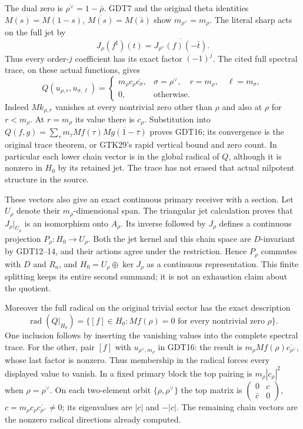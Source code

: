 The dual zero is $\rho^\vee=1-\bar\rho$.
GDT7 and the original theta identities
$M(s)=M(1-s)$,
$\overline{M(s)}=M(\bar s)$ show
$m_{\rho^\vee}=m_\rho$.
The literal sharp acts on the full jet by
\begin{equation}\tag{GDT15}
 J_\rho(f^\sharp)(t)=
 \overline{J_{\rho^\vee}(f)(-\bar t)}.
\end{equation}
Thus every order-$j$ coefficient has its exact
factor $(-1)^j$.
The cited full spectral trace, on these actual
functions, gives
\begin{equation}\tag{GDT16}
 Q(u_{\rho,r},u_{\sigma,\ell})=
 \begin{cases}
 m_\rho c_\rho\overline{c_\sigma},&
 \sigma=\rho^\vee,\quad r=m_\rho,\quad
                 \ell=m_\sigma,\\
 0,&\text{otherwise}.
 \end{cases}
\end{equation}
Indeed $Mk_{\rho,r}$ vanishes at every nontrivial
zero other than $\rho$ and also at $\rho$ for $r<m_\rho$.
At $r=m_\rho$ its value there is $c_\rho$.
Substitution into
$Q(f,g)=\sum_\tau m_\tau Mf(\tau)
\overline{Mg(1-\bar\tau)}$
proves GDT16; its convergence is the original trace
theorem, or GTK29's rapid vertical bound and zero
count. In particular each lower chain vector
is in the global radical of $Q$, although it is
nonzero in $H_0$ by its retained jet.
The trace has not erased that actual nilpotent
structure in the source.

These vectors also give an exact continuous primary
receiver with a section. Let $U_\rho$ denote their
$m_\rho$-dimensional span. The triangular jet
calculation proves that $J_\rho|_{U_\rho}$ is an
isomorphism onto $A_\rho$. Its inverse followed by
$J_\rho$ defines a continuous projection
$P_\rho:H_0\to U_\rho$.
Both the jet kernel and this chain space are
$D$-invariant by GDT12--14, and their actions agree
under the restriction. Hence $P_\rho$ commutes with
$D$ and $R_a$, and
$H_0=U_\rho\oplus\ker J_\rho$ as a continuous
representation. This finite splitting keeps its
entire second summand; it is not an exhaustion
claim about the quotient.

Moreover the full radical on the original trivial
sector has the exact description
\begin{equation}\tag{GDT16a}
 \operatorname{rad}(Q|_{H_0})=
 \{[f]\in H_0:Mf(\rho)=0
                \text{ for every nontrivial zero }\rho\}.
\end{equation}
One inclusion follows by inserting the vanishing
values into the complete spectral trace.
For the other, pair $[f]$ with
$u_{\rho^\vee,m_\rho}$ in GDT16:
the result is
$m_\rho Mf(\rho)\overline{c_{\rho^\vee}}$,
whose last factor is nonzero.
Thus membership in the radical forces every
displayed value to vanish. In a fixed primary
block the top pairing is $m_\rho|c_\rho|^2$
when $\rho=\rho^\vee$.
On each two-element orbit $\{\rho,\rho^\vee\}$
the top matrix is
$\left(\begin{smallmatrix}0&c\\\bar c&0\end{smallmatrix}\right)$,
$c=m_\rho c_\rho\overline{c_{\rho^\vee}}\ne0$;
its eigenvalues are $|c|$ and $-|c|$.
The remaining chain vectors are the nonzero
radical directions already computed.

